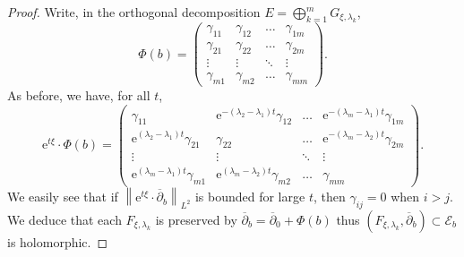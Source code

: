 \documentclass[10pt,a4paper]{amsart}
\newcommand{\E}{\mathcal{E}}
\newcommand{\dbar}{\overline{\partial}}
\newcommand{\e}{\boldsymbol{\mathrm{e}}}
\newcommand{\norme}[1]{\left\| #1 \right\|}
\begin{document}
\begin{proof}
\noindent{} Write, in the orthogonal decomposition $E = \bigoplus_{k = 1}^m G_{\xi,\lambda_k}$,
$$
\Phi(b) =
\begin{pmatrix}
\gamma_{11} & \gamma_{12} & \hdots & \gamma_{1m}\\
\gamma_{21} & \gamma_{22} & \hdots & \gamma_{2m}\\
\vdots & \vdots & \ddots & \vdots\\
\gamma_{m1} & \gamma_{m2} & \hdots & \gamma_{mm}
\end{pmatrix}.
$$
As before, we have, for all $t$,
$$
\e^{t\xi} \cdot \Phi(b) =
\begin{pmatrix}
\gamma_{11} & \e^{-(\lambda_2 - \lambda_1)t}\gamma_{12} & \hdots & \e^{-(\lambda_m - \lambda_1)t}\gamma_{1m}\\
\e^{(\lambda_2 - \lambda_1)t}\gamma_{21} & \gamma_{22} & \hdots & \e^{-(\lambda_m - \lambda_2)t}\gamma_{2m}\\
\vdots & \vdots & \ddots & \vdots\\
\e^{(\lambda_m - \lambda_1)t}\gamma_{m1} & \e^{(\lambda_m - \lambda_2)t}\gamma_{m2} & \hdots & \gamma_{mm}
\end{pmatrix}.
$$
We easily see that if $\norme{\e^{t\xi} \cdot \dbar_b}_{L^2}$ is bounded for large $t$, then $\gamma_{ij} = 0$ when $i > j$. We deduce that each $F_{\xi,\lambda_k}$ is preserved by $\dbar_b = \dbar_0 + \Phi(b)$ thus $(F_{\xi,\lambda_k},\dbar_b) \subset \E_b$ is holomorphic.
\end{proof}
\end{document}
